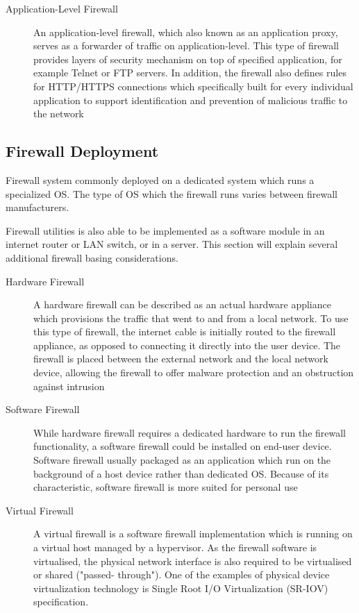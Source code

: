 \documentclass[../index.tex]{subfiles}
\begin{document}
\begin{description}
  \item[Application-Level Firewall] An application-level firewall, which also known as an
    application proxy, serves as a forwarder of traffic on application-level. This type of firewall
    provides layers of security mechanism on top of specified application, for example Telnet or FTP
    servers. In addition, the firewall also defines rules for HTTP/HTTPS connections which
    specifically built for every individual application to support identification and prevention of
    malicious traffic to the network

\end{description}

\subsection{Firewall Deployment}

Firewall system commonly deployed on a dedicated system which runs a specialized OS. The type of OS
which the firewall runs varies between firewall manufacturers.

Firewall utilities is also able to be implemented as a software module in an internet router or LAN
switch, or in a server. This section will explain several additional firewall basing considerations.

\begin{description}

  \item[Hardware Firewall] A hardware firewall can be described as an actual hardware appliance
    which provisions the traffic that went to and from a local network. To use this type of
    firewall, the internet cable is initially routed to the firewall appliance, as opposed to
    connecting it directly into the user device. The firewall is placed between the external network
    and the local network device, allowing the firewall to offer malware protection and an
    obstruction against intrusion

  \item[Software Firewall] While hardware firewall requires a dedicated hardware to run the firewall
    functionality, a software firewall could be installed on end-user device. Software firewall
    usually packaged as an application which run on the background of a host device rather than
    dedicated OS. Because of its characteristic, software firewall is more suited for personal use

  \item[Virtual Firewall] A virtual firewall is a software firewall implementation which is running
    on a virtual host managed by a hypervisor. As the firewall software is virtualised, the physical
    network interface is also required to be virtualised or shared ("passed- through"). One of the
    examples of physical device virtualization technology is Single Root I/O Virtualization (SR-IOV)
    specification.

\end{description}
\end{document}
